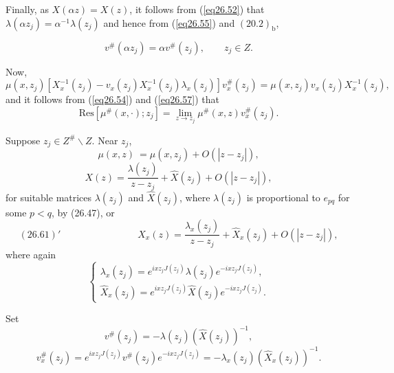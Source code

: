 \documentclass{surv-l}
\theoremstyle{plain}
\theoremstyle{definition}
\numberwithin{equation}{chapter}
\begin{document}
Finally, as $X(\alpha z)=X(z)$, it follows from (\ref{eq26.52}) that $\lambda(\alpha z_{j})=\alpha^{-1}\lambda(z_{j})$ and hence from (\ref{eq26.55}) and $(20.2)_\textrm{b}$,

\begin{equation}\label{eq26.58}
v^{\#}(\alpha z_{j})=\alpha v^{\#}(z_{j}),\qquad z_{j}\in Z.
\end{equation}

Now,
\begin{equation*}
\mu(x, z_{j})[X_{x}^{-1}(z_{j})-v_{x}(z_{j})X_{x}^{-1}(z_{j})\lambda_{x}(z_{j})]v_{x}^{\#}(z_{j})=\mu(x, z_{j})v_{x}(z_{j})X_{x}^{-1}(z_{j}),
\end{equation*}
and it follows from (\ref{eq26.54}) and (\ref{eq26.57}) that
\begin{equation}\label{eq26.59}
\mathrm{Res}[\mu^{\#}(x,\cdot);z_{j}]=\lim_{z\rightarrow z_{j}}\mu^{\#}(x, z)v_{x}^{\#} (z_{j}).
\end{equation}

Suppose $z_{j}\in Z^{\#}\backslash Z$. Near $z_{j}$,
\begin{equation}
\mu(x, z)\ =\mu(x,z_{j})+O(|z-z_{j}|),
\end{equation}
\begin{equation}\label{eq26.61}
X(z)=\frac{\lambda(z_{j})}{z-z_{j}}+\hat{X}(z_{j})+O(|z-z_{j}|),
\end{equation}
for suitable matrices $\lambda(z_{j})$ and $\hat{X}(z_{j})$, where $\lambda(z_{j})$ is proportional to $e_{pq}$ for some $p<q$, by (26.47), or
\begin{equation*}
(26.61)'\qquad\qquad\qquad\qquad X_{x}(z)=\displaystyle \frac{\lambda_{x}(z_{j})}{z-z_{j}}+\hat{X}_{x}(z_{j})+O(|z-z_{j}|),
\end{equation*}
where again
\begin{equation}\label{eq26.62}
\left\{\begin{array}{l}
\lambda_{x}(z_{j})=e^{ixz_{j}J(z_{j})}\lambda(z_{j})e^{-ixz_{j}J(z_{j})},\\
\hat{X}_{x}(z_{j})=e^{ixz_{j}J(z_{j})}\hat{X}(z_{j})e^{-ixz_{j}J(z_{j})}.
\end{array}\right.
\end{equation}

Set
\begin{equation}\label{eq26.63}
v^{\#}(z_{j})=-\lambda(z_{j})(\hat{X}(z_{j}))^{-1},
\end{equation}
\begin{equation}\label{eq26.64}
v_{x}^{\#}(z_{j})=e^{ixz_{j}J(z_{j})}v^{\#}(z_{j})e^{-ixz_{j}J(z_{j})}=-\lambda_{x}(z_{j})(\hat{X}_{x}(z_{j}))^{-1}.
\end{equation}
\end{document}
